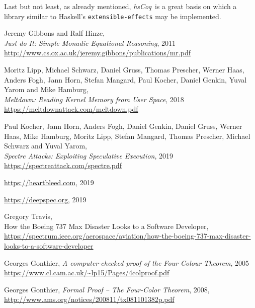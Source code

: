 \documentclass[declaration,inz,english,shortabstract]{iithesis}
\newcommand{\libname}{\textit{hsCoq}}
\newcommand{\m}[1]{\texttt{#1}}
\begin{document}
Last but not least, as already mentioned, \libname\ is a great basis on which a library similar to Haskell's \m{extensible-effects} may be implemented.


\begin{thebibliography}{1}

        Jeremy Gibbons and Ralf Hinze, \\
        \textit{Just do It: Simple Monadic Equational Reasoning}, 2011 \\
        \url{http://www.cs.ox.ac.uk/jeremy.gibbons/publications/mr.pdf}

        Moritz Lipp, Michael Schwarz, Daniel Gruss, Thomas Prescher, Werner Haas, Anders Fogh, Jann Horn, Stefan Mangard, Paul Kocher, Daniel Genkin, Yuval Yarom and Mike Hamburg, \\
        \textit{Meltdown: Reading Kernel Memory from User Space}, 2018 \\
        \url{https://meltdownattack.com/meltdown.pdf}

        Paul Kocher, Jann Horn, Anders Fogh, Daniel Genkin, Daniel Gruss, Werner Haas, Mike Hamburg, Moritz Lipp, Stefan Mangard, Thomas Prescher, Michael Schwarz and Yuval Yarom, \\
        \textit{Spectre Attacks: Exploiting Speculative Execution}, 2019 \\
        \url{https://spectreattack.com/spectre.pdf}
    
        \url{https://heartbleed.com},
        2019

        \url{https://deepspec.org},
        2019

        Gregory Travis, \\
        How the Boeing 737 Max Disaster Looks to a Software Developer, \\
        \url{https://spectrum.ieee.org/aerospace/aviation/how-the-boeing-737-max-disaster-looks-to-a-software-developer}
    
        Georges Gonthier,
        \textit{A computer-checked proof of the Four Colour Theorem}, 2005 \\
        \url{https://www.cl.cam.ac.uk/~lp15/Pages/4colproof.pdf}
    
        Georges Gonthier,
        \textit{Formal Proof -- The Four-Color Theorem}, 2008, \\
        \url{http://www.ams.org/notices/200811/tx081101382p.pdf}


\end{thebibliography}
\end{document}
